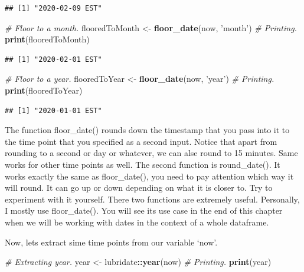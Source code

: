 \documentclass[]{book}
\newenvironment{Shaded}{\begin{snugshade}}{\end{snugshade}}
\newcommand{\CommentTok}[1]{\textcolor[rgb]{0.56,0.35,0.01}{\textit{#1}}}
\newcommand{\KeywordTok}[1]{\textcolor[rgb]{0.13,0.29,0.53}{\textbf{#1}}}
\newcommand{\NormalTok}[1]{#1}
\newcommand{\OperatorTok}[1]{\textcolor[rgb]{0.81,0.36,0.00}{\textbf{#1}}}
\newcommand{\StringTok}[1]{\textcolor[rgb]{0.31,0.60,0.02}{#1}}
\begin{document}
\begin{verbatim}
## [1] "2020-02-09 EST"
\end{verbatim}

\begin{Shaded}
\begin{Highlighting}[]
\CommentTok{# Floor to a month.}
\NormalTok{flooredToMonth <-}\StringTok{ }\KeywordTok{floor_date}\NormalTok{(now, }\StringTok{'month'}\NormalTok{)}
\CommentTok{# Printing.}
\KeywordTok{print}\NormalTok{(flooredToMonth)}
\end{Highlighting}
\end{Shaded}

\begin{verbatim}
## [1] "2020-02-01 EST"
\end{verbatim}

\begin{Shaded}
\begin{Highlighting}[]
\CommentTok{# Floor to a year.}
\NormalTok{flooredToYear <-}\StringTok{ }\KeywordTok{floor_date}\NormalTok{(now, }\StringTok{'year'}\NormalTok{)}
\CommentTok{# Printing.}
\KeywordTok{print}\NormalTok{(flooredToYear)}
\end{Highlighting}
\end{Shaded}

\begin{verbatim}
## [1] "2020-01-01 EST"
\end{verbatim}

The function floor\_date() rounds down the timestamp that you pass into it to the time point that you specified as a second input. Notice that apart from rounding to a second or day or whatever, we can alse round to 15 minutes. Same works for other time points as well. The second function is round\_date(). It works exactly the same as floor\_date(), you need to pay attention which way it will round. It can go up or down depending on what it is closer to. Try to experiment with it yourself. There two functions are extremely useful. Personally, I mostly use floor\_date(). You will see its use case in the end of this chapter when we will be working with dates in the context of a whole dataframe.

Now, lets extract sime time points from our variable `now'.

\begin{Shaded}
\begin{Highlighting}[]
\CommentTok{# Extracting year.}
\NormalTok{year <-}\StringTok{ }\NormalTok{lubridate}\OperatorTok{::}\KeywordTok{year}\NormalTok{(now)}
\CommentTok{# Printing.}
\KeywordTok{print}\NormalTok{(year)}
\end{Highlighting}
\end{Shaded}
\end{document}

